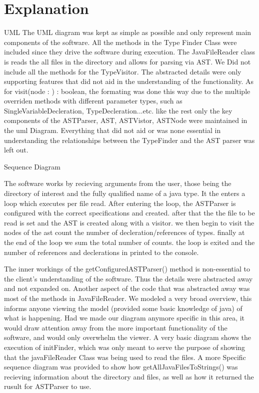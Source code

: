 \documentclass[12p]{article}
\begin{document}
\section{Explanation}

UML 
The UML diagram was kept as simple as possible and only represent main components of the software. All the methods in the Type Finder Class were included since they drive the software during execution. The JavaFileReader class is reads the all files in the directory and allows for parsing via AST. We Did not include all the methods for the TypeVisitor. The abstracted details were only supporting features that did not aid in the understanding of the functionality. As for visit(node : ) : boolean, the formating was done this way due to the multiple overriden methods with different parameter types, such as SingleVariableDecleration, TypeDecleration...etc. 
like the rest only the key components of  the ASTParser, AST, ASTVistor, ASTNode were maintained in the uml Diagram. Everything that did not aid or was none essential in understanding the relationships between the TypeFinder and the AST parser was left out. 

Sequence Diagram

The software works by recieving arguments from the user, those being the directory of interest and the fully qualified name of a java type. It the enters a loop which executes per file read. After entering the loop, the ASTParser is configured with the correct specifications  and created. after that the the file to be read is set and the AST is created along with a visitor. we then begin to visit the nodes of the ast count the number of decleration/references of types. finally at the end of the loop we sum the total number of counts. the loop is exited and the number of references and declerations in printed to the console.  

The inner workings of the getConfiguredASTParser() method is non-essential to the client's understanding of the software. Thus the details were abstracted away and not expanded on. Another aspect of the code that was abstracted away was most of the methods in JavaFileReader. We modeled a very broad overview, this informs anyone viewing the model (provided some basic knowledge of java) of what is happening. Had we made our diagram anymore specific in this area, it would draw attention away from the more important functionality of the software, and would only overwhelm the viewer. A very basic diagram shows the execution of initFinder, which was only meant to serve the purpose of showing that the javaFileReader Class was being used to read the files. A more Specific sequence diagram was provided to show how getAllJavaFilesToStrings() was recieving information about the directory and files, as well as how it returned the rusult for ASTParser to use.
\end{document}
